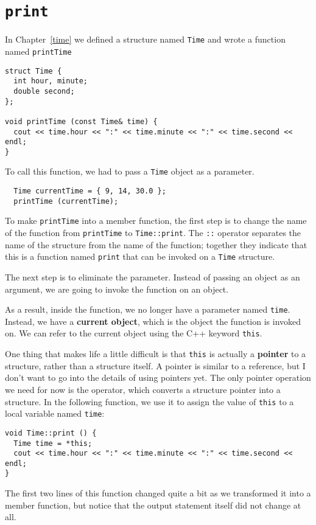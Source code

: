 \section{{\tt print}}

In Chapter~\ref{time} we defined a structure named {\tt Time}
and wrote a function named {\tt printTime}

\begin{verbatim}
struct Time {
  int hour, minute;
  double second;
};

void printTime (const Time& time) {
  cout << time.hour << ":" << time.minute << ":" << time.second << endl;
}
\end{verbatim}
%
To call this function, we had to pass a {\tt Time} object as
a parameter.

\begin{verbatim}
  Time currentTime = { 9, 14, 30.0 };
  printTime (currentTime);
\end{verbatim}
%
To make {\tt printTime} into a member function, the
first step is to change the name of the function from {\tt printTime}
to {\tt Time::print}.  The {\tt ::} operator separates the name
of the structure from the name of the function; together they
indicate that this is a function named {\tt print} that can be
invoked on a {\tt Time} structure.

The next step is to eliminate the parameter.  Instead of passing
an object as an argument, we are going to invoke the function
on an object.

As a result, inside the function, we no longer have a parameter named
{\tt time}.  Instead, we have a {\bf current object}, which is the
object the function is invoked on.  We can refer to the current object
using the C++ keyword {\tt this}.


One thing that makes life a little difficult is that {\tt this}
is actually a {\bf pointer} to a structure, rather than a structure
itself.  A pointer is similar to a reference, but I don't want
to go into the details of using pointers yet.  The only pointer
operation we need for now is the {\tt *} operator, which converts
a structure pointer into a structure.  In the following
function, we use it to assign the value of {\tt this} to a local
variable named {\tt time}:

\begin{verbatim}
void Time::print () {
  Time time = *this;
  cout << time.hour << ":" << time.minute << ":" << time.second << endl;
}
\end{verbatim}
%
The first two lines of this function changed quite a bit as we
transformed it into a member function, but notice that the output
statement itself did not change at all.

